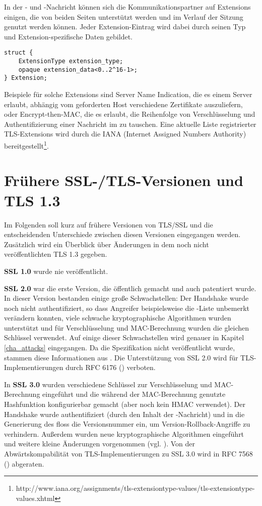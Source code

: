 In der \clienthello{}- und \serverhello{}-Nachricht können sich die Kommunikationspartner auf Extensions einigen, die von beiden Seiten unterstützt werden und im Verlauf der Sitzung genutzt werden können. Jeder Extension-Eintrag wird dabei durch seinen Typ und Extension-spezifische Daten gebildet. 
\begin{lstlisting}
struct {
	ExtensionType extension_type;
	opaque extension_data<0..2^16-1>;
} Extension;
\end{lstlisting}

Beispiele für solche Extensions sind Server Name Indication, die es einem Server erlaubt, abhängig vom geforderten Host verschiedene Zertifikate auszuliefern, oder Encrypt-then-MAC, die es erlaubt, die Reihenfolge von Verschlüsselung und Authentifizierung einer Nachricht im \recordprotocol{} zu tauschen. Eine aktuelle Liste registrierter TLS-Extensions wird durch die IANA (Internet Assigned Numbers Authority) bereitgestellt\footnote{http://www.iana.org/assignments/tls-extensiontype-values/tls-extensiontype-values.xhtml}.

\section{Frühere SSL-/TLS-Versionen und TLS 1.3}
\label{sec_ssl_tls_version_overview}

Im Folgenden soll kurz auf frühere Versionen von TLS/SSL und die entscheidenden Unterschiede zwischen diesen Versionen eingegangen werden. Zusätzlich wird ein Überblick über Änderungen in dem noch nicht veröffentlichten TLS 1.3 gegeben.

\textbf{SSL 1.0} wurde nie veröffentlicht.

\textbf{SSL 2.0} war die erste Version, die öffentlich gemacht und auch patentiert wurde. In dieser Version bestanden einige große Schwachstellen: Der Handshake wurde noch nicht authentifiziert, so dass Angreifer beispielsweise die \ciphersuite-Liste unbemerkt verändern konnten, viele schwache kryptographische Algorithmen wurden unterstützt und für Verschlüsselung und MAC-Berechnung wurden die gleichen Schlüssel verwendet. Auf einige dieser Schwachstellen wird genauer in Kapitel \ref{cha_attacks} eingegangen. Da die Spezifikation nicht veröffentlicht wurde, stammen diese Informationen aus \cite{meyer14}. Die Unterstützung von SSL 2.0 wird für TLS-Implementierungen durch RFC 6176 (\cite{prohibit_ssl20}) verboten.

In \textbf{SSL 3.0} wurden verschiedene Schlüssel zur Verschlüsselung und MAC-Berechnung eingeführt und die während der MAC-Berechnung genutzte Hashfunktion konfigurierbar gemacht (aber noch kein HMAC verwendet). Der Handshake wurde authentifiziert (durch den Inhalt der \finished{}-Nachricht) und in die Generierung des \premastersecret{} floss die Versionsnummer ein, um Version-Rollback-Angriffe zu verhindern. Außerdem wurden neue kryptographische Algorithmen eingeführt und weitere kleine Änderungen vorgenommen (vgl. \cite{ssl30}). Von der Abwärtskompabilität von TLS-Implementierungen zu SSL 3.0 wird in RFC 7568 (\cite{deprecate_ssl30}) abgeraten.

